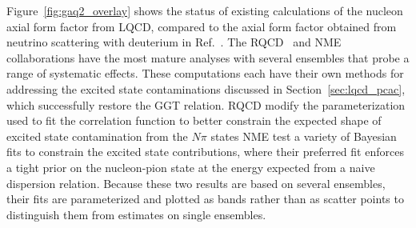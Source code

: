 

Figure~\ref{fig:gaq2_overlay} shows the status of existing calculations of
 the nucleon axial form factor from LQCD,
 compared to the axial form factor obtained from neutrino scattering
 with deuterium in Ref.~\cite{Meyer:2016oeg}.
The RQCD~\cite{RQCD:2019jai} and NME~\cite{Park:2021ypf} collaborations
 have the most mature analyses with several ensembles that probe a range of
 systematic effects.
These computations each have their own methods for addressing the
 excited state contaminations discussed in Section~\ref{sec:lqcd_pcac},
 which successfully restore the GGT relation.
RQCD modify the parameterization used to fit the correlation function
 to better constrain the expected shape of excited state contamination from the $N\pi$ states 
NME test a variety of Bayesian fits to constrain the excited state contributions,
 where their preferred fit enforces a tight prior on the nucleon-pion state
 at the energy expected from a naive dispersion relation.
Because these two results are based on several ensembles,
 their fits are parameterized and plotted as bands rather than as scatter points
 to distinguish them from estimates on single ensembles.

